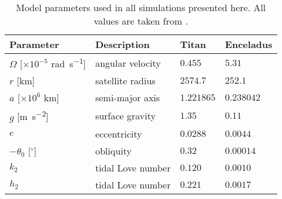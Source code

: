 \begin{table}[!t]
\scriptsize
\centering
\begin{tabularx}{\linewidth}{p{1.8cm} p{2cm} p{1cm} p{1.2cm}}
 \toprule
Parameter & Description & Titan & Enceladus\\
 \midrule \midrule
$\Omega$ [$\times 10^{-5}$ \si{\radian\per\second}]	& angular velocity 		& $0.455$ & $5.31 $ \\
$r$ [\si{\kilo\metre}]				& satellite radius 		& $2574.7$ & $252.1$\\
$a$ [$\times 10^6$ \si{\kilo\metre}]				& semi-major axis 		& $1.221865$ & $0.238042$\\
$g$ [\si{\metre\per\second\squared}]		& surface gravity 		& $1.35$ & $0.11$\\
$e$ 								& eccentricity 			& $0.0288$ & $0.0044$\\
$-\theta_0$ [$^{\circ}$] 			& obliquity 			& $0.32$ & $0.00014$\\
$k_2$ 								& tidal Love number 	& $0.120$ & $0.0010$\\
$h_2$ 								& tidal Love number 	& $0.221$ & $0.0017$\\
 \bottomrule
\end{tabularx}
\caption{Model parameters used in all simulations presented here. All values are taken from \citet{zebker2009size,chen2013tidal,matsuyama2014tidal}.  \label{tb:param}}
\end{table}